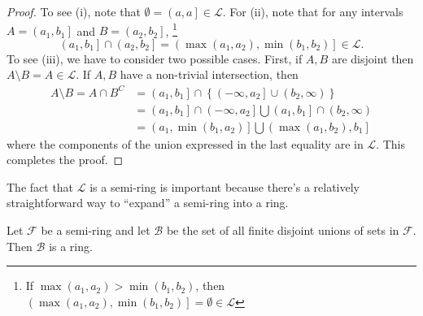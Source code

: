 \begin{proof}
To see (i), note that $\emptyset=\left(a,a\right]\in\mathcal{L}$.
For (ii), note that for any intervals $A=\left(a_{1},b_{1}\right]$
and $B=\left(a_{2},b_{2}\right]$, \footnote{If $\max\left(a_{1},a_{2}\right)>\min\left(b_{1},b_{2}\right)$, then
$\left(\max\left(a_{1},a_{2}\right),\min\left(b_{1},b_{2}\right)\right]=\emptyset\in\mathcal{L}$}
\[
\left(a_{1},b_{1}\right]\cap\left(a_{2},b_{2}\right]=\left(\max\left(a_{1},a_{2}\right),\min\left(b_{1},b_{2}\right)\right]\in\mathcal{L}.
\]
To see (iii), we have to consider two possible cases. First, if $A,B$
are disjoint then $A\setminus B=A\in\mathcal{L}.$ If $A,B$ have
a non-trivial intersection, then
\begin{align*}
A\setminus B=A\cap B^{C} & =\left(a_{1},b_{1}\right]\cap\left\{ \left(-\infty,a_{2}\right]\cup\left(b_{2},\infty\right)\right\} \\
 & =\left(a_{1},b_{1}\right]\cap\left(-\infty,a_{2}\right]\bigcup\left(a_{1},b_{1}\right]\cap\left(b_{2},\infty\right)\\
 & =\left(a_{1},\min\left(b_{1},a_{2}\right)\right]\bigcup\left(\max\left(a_{1},b_{2}\right),b_{1}\right]
\end{align*}
where the components of the union expressed in the last equality are
in $\mathcal{L}$. This completes the proof.
\end{proof}
The fact that $\mathcal{L}$ is a semi-ring is important because there's
a relatively straightforward way to ``expand'' a semi-ring into
a ring.
\begin{thm}
\label{thm:expandSemiRing}Let $\mathcal{F}$ be a semi-ring and let
$\mathcal{B}$ be the set of all finite disjoint unions of sets in
$\mathcal{F}$. Then $\mathcal{B}$ is a ring.
\end{thm}

